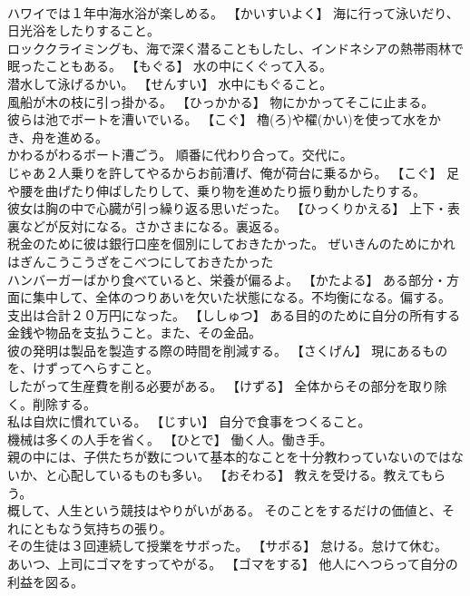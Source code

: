 \documentclass[8pt]{extreport}
\begin{document}
\begin{CJK}{UTF8}{min}
\\	ハワイでは１年中海水浴が楽しめる。	【かいすいよく】 海に行って泳いだり、日光浴をしたりすること。
\\	ロッククライミングも、海で深く潜ることもしたし、インドネシアの熱帯雨林で眠ったこともある。	【もぐる】 水の中にくぐって入る。
\\	潜水して泳げるかい。	【せんすい】 水中にもぐること。
\\	風船が木の枝に引っ掛かる。	【ひっかかる】 物にかかってそこに止まる。
\\	彼らは池でボートを漕いでいる。	【こぐ】 櫓(ろ)や櫂(かい)を使って水をかき、舟を進める。
\\	かわるがわるボート漕ごう。	順番に代わり合って。交代に。
\\	じゃあ２人乗りを許してやるからお前漕げ、俺が荷台に乗るから。	【こぐ】 足や腰を曲げたり伸ばしたりして、乗り物を進めたり振り動かしたりする。
\\	彼女は胸の中で心臓が引っ繰り返る思いだった。	【ひっくりかえる】 上下・表裏などが反対になる。さかさまになる。裏返る。
\\	税金のために彼は銀行口座を個別にしておきたかった。	ぜいきんのためにかれはぎんこうこうざをこべつにしておきたかった 
\\	ハンバーガーばかり食べていると、栄養が偏るよ。	【かたよる】 ある部分・方面に集中して、全体のつりあいを欠いた状態になる。不均衡になる。偏する。
\\	支出は合計２０万円になった。	【ししゅつ】 ある目的のために自分の所有する金銭や物品を支払うこと。また、その金品。
\\	彼の発明は製品を製造する際の時間を削減する。	【さくげん】 現にあるものを、けずってへらすこと。
\\	したがって生産費を削る必要がある。	【けずる】 全体からその部分を取り除く。削除する。
\\	私は自炊に慣れている。	【じすい】 自分で食事をつくること。
\\	機械は多くの人手を省く。	【ひとで】 働く人。働き手。
\\	親の中には、子供たちが数について基本的なことを十分教わっていないのではないか、と心配しているものも多い。	【おそわる】 教えを受ける。教えてもらう。
\\	概して、人生という競技はやりがいがある。	そのことをするだけの価値と、それにともなう気持ちの張り。
\\	その生徒は３回連続して授業をサボった。	【サボる】 怠ける。怠けて休む。
\\	あいつ、上司にゴマをすってやがる。	【ゴマをする】 他人にへつらって自分の利益を図る。

\end{CJK}
\end{document}
